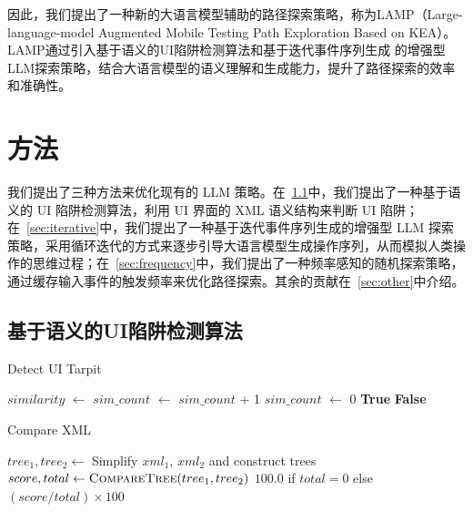 \documentclass[twocolumn, 10pt]{article}
\newcommand{\kea}{K{\small\MakeUppercase{ea}}}
\newcommand{\lamp}{L{\small\MakeUppercase{amp}}}
\begin{document}
因此，我们提出了一种新的大语言模型辅助的路径探索策略，称为\lamp（Large-language-model Augmented Mobile Testing Path Exploration Based on \kea）。\lamp 通过引入基于语义的UI陷阱检测算法和基于迭代事件序列生成 的增强型LLM探索策略，结合大语言模型的语义理解和生成能力，提升了路径探索的效率和准确性。

\section{方法}

我们提出了三种方法来优化现有的 LLM 策略。在\textsection~\ref{sec:semantic}中，我们提出了一种基于语义的 UI 陷阱检测算法，利用 UI 界面的 XML 语义结构来判断 UI 陷阱；在\textsection~\ref{sec:iterative}中，我们提出了一种基于迭代事件序列生成的增强型 LLM 探索策略，采用循环迭代的方式来逐步引导大语言模型生成操作序列，从而模拟人类操作的思维过程；在\textsection~\ref{sec:frequency}中，我们提出了一种频率感知的随机探索策略，通过缓存输入事件的触发频率来优化路径探索。其余的贡献在\textsection~\ref{sec:other}中介绍。

\subsection{基于语义的UI陷阱检测算法}
\label{sec:semantic}

\begin{algorithm}[t]
\caption{Detect UI Tarpit}
\label{alg:detect_tarpit}
\begin{algorithmic}[1]
    \State $similarity$ $\gets$ 
    \State $sim\_count$ $\gets$ $sim\_count$ + 1
        \State $sim\_count$ $\gets$ 0
        \State \Return \textbf{True}
    \EndIf
\EndIf
\State \Return \textbf{False}
\EndFunction
\end{algorithmic}
\end{algorithm}

\begin{algorithm}[t]
\caption{Compare XML}
\label{alg:compare_xml}
\begin{algorithmic}[1]
    \State $tree_1, tree_2 \gets$ Simplify $xml_1$, $xml_2$ and construct trees
    \State $score, total \gets \Call{CompareTree}{tree_1, tree_2}$
    \State \Return $100.0$ if $total = 0$ else $(score / total) \times 100$
\EndFunction
\end{algorithmic}
\end{algorithm}
\end{document}
